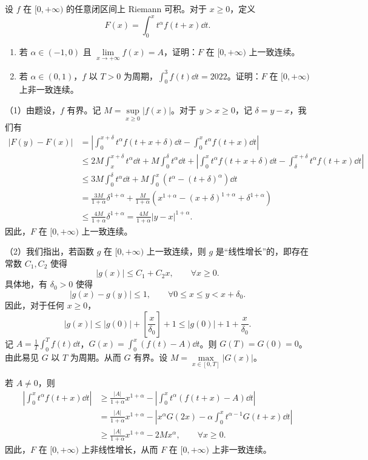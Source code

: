 设 $f$ 在 $[0,+\infty)$ 的任意闭区间上 Riemann 可积。对于 $x\ge0$，定义
\[
F(x)=\int_0^xt^\alpha f(t+x)\dd t.
\]
\begin{enumerate}
  \item 若 $\alpha\in(-1,0)$ 且 $\lim\limits_{x\to+\infty}f(x)=A$，证明：$F$ 在 $[0,+\infty)$ 上一致连续。
  \item 若 $\alpha\in(0,1)$，$f$ 以 $T>0$ 为周期，$\int_0^3f(t)\dd t=2022$。证明：$F$ 在 $[0,+\infty)$ 上非一致连续。
\end{enumerate}
\begin{solution}
（1）由题设，$f$ 有界。记 $M=\sup\limits_{x\ge0}|f(x)|$。对于 $y>x\ge0$，记 $\delta=y-x$，我们有
\begin{align*}
|F(y)-F(x)|
&=\left|\int_0^{x+\delta}t^\alpha f(t+x+\delta)\dd t-\int_0^xt^\alpha f(t+x)\dd t\right|\\
&\le2M\int_x^{x+\delta}t^\alpha\dd t+M\int_0^{\delta}t^\alpha\dd t
+\left|\int_0^xt^\alpha f(t+x+\delta)\dd t-\int_\delta^{x+\delta}t^\alpha f(t+x)\dd t\right|\\
&\le3M\int_0^{\delta}t^\alpha\dd t+M\int_0^x\left(t^\alpha-(t+\delta)^\alpha\right)\dd t\\
&=\frac{3M}{1+\alpha}\delta^{1+\alpha}+\frac{M}{1+\alpha}\left(x^{1+\alpha}-(x+\delta)^{1+\alpha}+\delta^{1+\alpha}\right)\\
&\le\frac{4M}{1+\alpha}\delta^{1+\alpha}=\frac{4M}{1+\alpha}|y-x|^{1+\alpha}.
\end{align*}
因此，$F$ 在 $[0,+\infty)$ 上一致连续。

（2）我们指出，若函数 $g$ 在 $[0,+\infty)$ 上一致连续，则 $g$ 是“线性增长”的，即存在常数 $C_1,C_2$ 使得
\[
|g(x)|\le C_1+C_2x,\qquad \forall x\ge0.
\]
具体地，有 $\delta_0>0$ 使得
\[
|g(x)-g(y)|\le1,\qquad \forall0\le x\le y<x+\delta_0.
\]
因此，对于任何 $x\ge0$，
\[
|g(x)|\le|g(0)|+\left[\frac{x}{\delta_0}\right]+1\le|g(0)|+1+\frac{x}{\delta_0}.
\]
记 $A=\frac{1}{T}\int_0^Tf(t)\dd t$，$G(x)=\int_0^x\left(f(t)-A\right)\dd t$。则 $G(T)=G(0)=0$。由此易见 $G$ 以 $T$ 为周期。从而 $G$ 有界。设 $M=\max\limits_{x\in[0,T]}|G(x)|$。

若 $A\ne0$，则
\begin{align*}
\left|\int_0^xt^\alpha f(t+x)\dd t\right|
&\ge\frac{|A|}{1+\alpha}x^{1+\alpha}-\left|\int_0^xt^\alpha\left(f(t+x)-A\right)\dd t\right|\\
&=\frac{|A|}{1+\alpha}x^{1+\alpha}-\left|x^\alpha G(2x)-\alpha\int_0^xt^{\alpha-1}G(t+x)\dd t\right|\\
&\ge\frac{|A|}{1+\alpha}x^{1+\alpha}-2Mx^\alpha,\qquad \forall x\ge0.
\end{align*}
因此，$F$ 在 $[0,+\infty)$ 上非线性增长，从而 $F$ 在 $[0,+\infty)$ 上非一致连续。


\end{solution}
